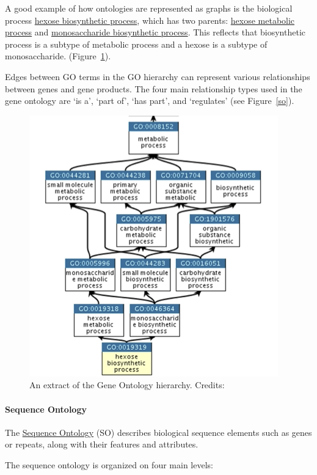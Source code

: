 A good example of how ontologies are represented as graphs is the biological process \href{http://amigo.geneontology.org/amigo/term/GO:0019319}{hexose biosynthetic process}, which has two parents: \href{http://amigo.geneontology.org/amigo/term/GO:0019318}{hexose metabolic process} and \href{http://amigo.geneontology.org/amigo/term/GO:0046364}{monosaccharide biosynthetic process}.
This reflects that biosynthetic process is a subtype of metabolic process and a hexose is a subtype of monosaccharide. (Figure~\ref{go}).

Edges between GO terms in the GO hierarchy can represent various relationships between genes and gene products.
The four main relationship types used in the gene ontology are `is a', `part of', `has part', and `regulates' (see Figure~\ref{so}).

\begin{figure}[!htbp]
\centering
\includegraphics[width=0.55\linewidth]{files/go-67ecfd572d47f6ed3bdc35c0013264b8.png}
\caption[]{An extract of the Gene Ontology hierarchy.
Credits: \cite{go_2009}}
\label{go}
\end{figure}

\paragraph{Sequence Ontology}\label{chapter1_sequence_ontology}

The \href{http://sequenceontology.org}{Sequence Ontology} (SO) describes biological sequence elements such as genes or repeats, along with their features and attributes.

The sequence ontology is organized on four main levels:

